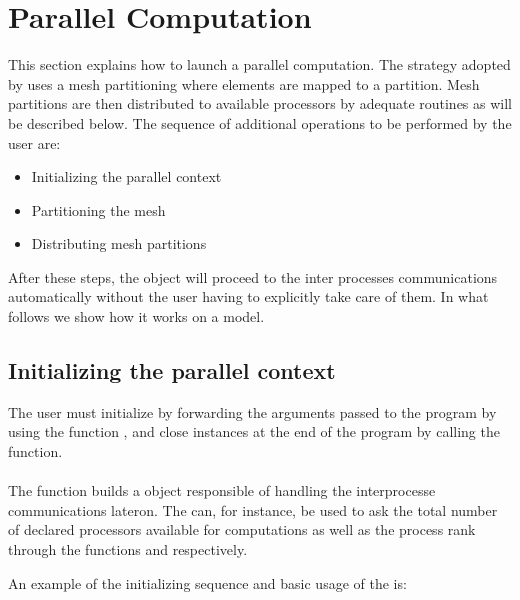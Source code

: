 \chapter{Parallel Computation}

This section explains how to launch a parallel computation.  The strategy
adopted by \akantu uses a mesh partitioning where elements are mapped to a
partition. Mesh partitions are then distributed to available processors by
adequate routines as will be described below.  The sequence of additional
operations to be performed by the user are:

\begin{itemize}
\item Initializing the parallel context
\item Partitioning the mesh
\item Distributing mesh partitions
\end{itemize}

After these steps, the 
object will proceed to the inter processes communications automatically
without the user having to explicitly take care of them.
In what follows we show how it works on a  model.

\section{Initializing the parallel context}

The user must initialize \akantu by forwarding the arguments passed to the
program by using the function , and close \akantu instances
at the end of the program by calling the  function.\\

\\

The  function builds a  object
responsible of handling the interprocesse communications lateron.  The
 can, for instance, be used to ask the total number of
declared processors available for computations as well as the process rank
through the functions  and  respectively.

An example of the initializing sequence and basic usage of the
 is:

